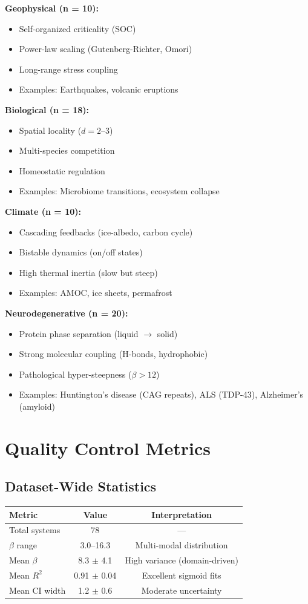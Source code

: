 \documentclass[11pt,a4paper]{article}
\begin{document}
\textbf{Geophysical (n = 10):}
\begin{itemize}
\item Self-organized criticality (SOC)
\item Power-law scaling (Gutenberg-Richter, Omori)
\item Long-range stress coupling
\item Examples: Earthquakes, volcanic eruptions
\end{itemize}

\textbf{Biological (n = 18):}
\begin{itemize}
\item Spatial locality ($d = 2$--3)
\item Multi-species competition
\item Homeostatic regulation
\item Examples: Microbiome transitions, ecosystem collapse
\end{itemize}

\textbf{Climate (n = 10):}
\begin{itemize}
\item Cascading feedbacks (ice-albedo, carbon cycle)
\item Bistable dynamics (on/off states)
\item High thermal inertia (slow but steep)
\item Examples: AMOC, ice sheets, permafrost
\end{itemize}

\textbf{Neurodegenerative (n = 20):}
\begin{itemize}
\item Protein phase separation (liquid $\to$ solid)
\item Strong molecular coupling (H-bonds, hydrophobic)
\item Pathological hyper-steepness ($\beta > 12$)
\item Examples: Huntington's disease (CAG repeats), ALS (TDP-43), Alzheimer's (amyloid)
\end{itemize}

\section{Quality Control Metrics}

\subsection{Dataset-Wide Statistics}

\begin{tabular}{lcc}
\toprule
\textbf{Metric} & \textbf{Value} & \textbf{Interpretation} \\
\midrule
Total systems & 78 & --- \\
$\beta$ range & 3.0--16.3 & Multi-modal distribution \\
Mean $\beta$ & 8.3 $\pm$ 4.1 & High variance (domain-driven) \\
Mean $R^2$ & 0.91 $\pm$ 0.04 & Excellent sigmoid fits \\
Mean CI width & 1.2 $\pm$ 0.6 & Moderate uncertainty \\
\bottomrule
\end{tabular}
\end{document}

